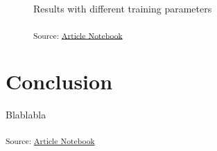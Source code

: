\documentclass[
]{report}
\begin{document}
\begin{figure}[H]


\caption{\label{fig-training-parameters}Results with different training
parameters}

\end{figure}%

\begin{figure}

\textsubscript{Source:
\href{https://ZokszY.github.io/Geodan-internship-report/index-preview.html}{Article
Notebook}}

\end{figure}%

\chapter*{Conclusion}\label{conclusion}

Blablabla

\textsubscript{Source:
\href{https://ZokszY.github.io/Geodan-internship-report/index-preview.html}{Article
Notebook}}


\printbibliography[title=Bibliography]
\end{document}
